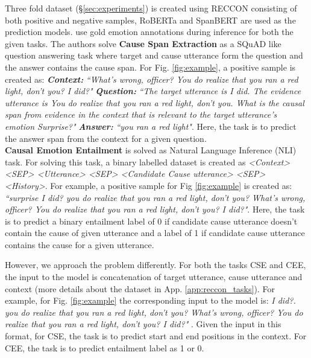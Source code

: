 \documentclass{article}
\begin{document}
Three fold dataset (\S\ref{sec:experiments}) is created using RECCON consisting of both positive and negative samples, RoBERTa \cite{liu2019roberta} and SpanBERT \cite{joshi2020spanbert} are used as the prediction models. \citet{poria2020recognizing} use gold emotion annotations during inference for both the given tasks. The authors solve \textbf{Cause Span Extraction} as a SQuAD like question answering task where target and cause utterance form the question and the answer contains the cause span. 
For Fig. \ref{fig:example}, a positive sample is created as: \textit{\textbf{Context:}} \textit{``What's wrong, officer? You do realize that you ran a red light, don't you? I did?"}
\textit{\textbf{Question:}} \textit{``The target utterance is I did. The evidence utterance is You do realize that you ran a red light, don't you. What is the causal span from evidence in the context that is relevant to the target utterance’s emotion Surprise?"}
\textit{\textbf{Answer:}} \textit{``you ran a red light"}.  Here, the task is to predict the answer span from the context for a given question.\\
\textbf{Causal Emotion Entailment} is solved as Natural Language Inference (NLI) task. For solving this task, a binary labelled dataset is created as \textit{<Context> <SEP> <Utterance> <SEP> <Candidate Cause utterance> <SEP> <History>}. For example, a positive sample for Fig \ref{fig:example} is created as: \textit{``surprise  I did?  you do realize that you ran a red light, don't you?  What's wrong, officer? You do realize that you ran a red light, don't you? I did?"}. Here, the task is to predict a binary entailment label of 0 if candidate cause utterance doesn't contain the cause of given utterance and a label of 1 if candidate cause utterance contains the cause for a given utterance. 

However, we approach the problem differently. For both the tasks CSE and CEE, the input to the model is concatenation of target utterance, cause utterance and context (more details about the  dataset in App. \ref{app:reccon_tasks}). For example, for Fig. \ref{fig:example} the corresponding input to the model is:
\textit{I did?. you do realize that you ran a red light, don't you?  What's wrong, officer? You do realize that you ran a red light, don't you? I did?" 
}. Given the input in this format, for CSE, the task is to predict start and end positions in the context. For CEE, the task is to predict entailment label as 1 or 0. 
\end{document}
